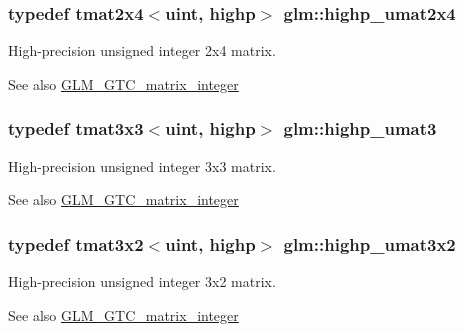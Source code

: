 \subsubsection[{highp\+\_\+umat2x4}]{\setlength{\rightskip}{0pt plus 5cm}typedef tmat2x4$<${\bf uint}, highp$>$ {\bf glm\+::highp\+\_\+umat2x4}}\label{group__gtc__matrix__integer_gafcec07e857ea0445d93680411e86482c}
High-\/precision unsigned integer 2x4 matrix. \begin{DoxySeeAlso}{See also}
\hyperlink{group__gtc__matrix__integer}{G\+L\+M\+\_\+\+G\+T\+C\+\_\+matrix\+\_\+integer} 
\end{DoxySeeAlso}
\hypertarget{group__gtc__matrix__integer_ga58bc8d0aeac88af0d38723b5cfa4fa67}{}
\subsubsection[{highp\+\_\+umat3}]{\setlength{\rightskip}{0pt plus 5cm}typedef tmat3x3$<${\bf uint}, highp$>$ {\bf glm\+::highp\+\_\+umat3}}\label{group__gtc__matrix__integer_ga58bc8d0aeac88af0d38723b5cfa4fa67}
High-\/precision unsigned integer 3x3 matrix. \begin{DoxySeeAlso}{See also}
\hyperlink{group__gtc__matrix__integer}{G\+L\+M\+\_\+\+G\+T\+C\+\_\+matrix\+\_\+integer} 
\end{DoxySeeAlso}
\hypertarget{group__gtc__matrix__integer_ga7484178233773045088b42f362dade86}{}
\subsubsection[{highp\+\_\+umat3x2}]{\setlength{\rightskip}{0pt plus 5cm}typedef tmat3x2$<${\bf uint}, highp$>$ {\bf glm\+::highp\+\_\+umat3x2}}\label{group__gtc__matrix__integer_ga7484178233773045088b42f362dade86}
High-\/precision unsigned integer 3x2 matrix. \begin{DoxySeeAlso}{See also}
\hyperlink{group__gtc__matrix__integer}{G\+L\+M\+\_\+\+G\+T\+C\+\_\+matrix\+\_\+integer} 
\end{DoxySeeAlso}
\hypertarget{group__gtc__matrix__integer_ga770b01686af4fbbb13bbd7bd97d60fe4}{}
